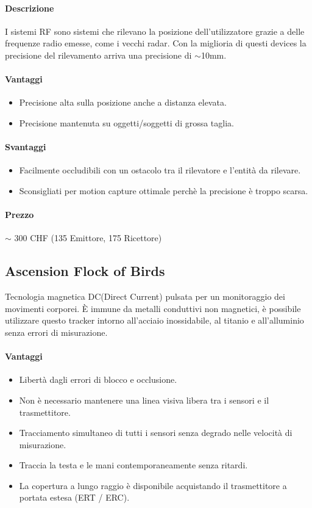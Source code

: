 \documentclass[8pt]{extarticle}
\begin{document}
\begin{multicols}{3}
\paragraph{Descrizione}
I sistemi RF sono sistemi che rilevano la posizione dell'utilizzatore grazie a delle 
frequenze radio emesse, come i vecchi radar. Con la miglioria di questi devices la 
precisione del rilevamento arriva una precisione di $\sim$10mm.
\paragraph{Vantaggi}
\begin{itemize}
    \item Precisione alta sulla posizione anche a distanza elevata.
    \item Precisione mantenuta su oggetti/soggetti di grossa taglia.
\end{itemize}
\paragraph{Svantaggi}
\begin{itemize}
    \item Facilmente occludibili con un ostacolo tra il rilevatore e l'entità da
    rilevare.
    \item Sconsigliati per motion capture ottimale perchè la precisione è troppo scarsa.
\end{itemize}
\paragraph{Prezzo} $\sim$ 300 CHF (135 Emittore, 175 Ricettore) 

\subsection{Ascension Flock of Birds}
Tecnologia magnetica DC(Direct Current) pulsata per un monitoraggio dei movimenti corporei. È immune da metalli conduttivi non magnetici, è
possibile utilizzare questo tracker intorno all'acciaio inossidabile, al titanio e all'alluminio senza errori di misurazione.
\paragraph{Vantaggi}
\begin{itemize}
    \item Libertà dagli errori di blocco e occlusione.
    \item Non è necessario mantenere una linea visiva libera tra i sensori e il trasmettitore.
    \item Tracciamento simultaneo di tutti i sensori senza degrado nelle velocità di misurazione.
    \item Traccia la testa e le mani contemporaneamente senza ritardi.
    \item La copertura a lungo raggio è disponibile acquistando il trasmettitore a portata estesa (ERT / ERC).
\end{itemize}

\end{multicols}
\end{document}
